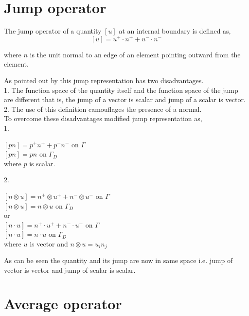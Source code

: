 \documentclass[a4paper]{book}
\begin{document}
\section{Jump operator}

The jump operator of a quantity $[u]$ at an internal boundary is defined as,
\begin{equation}\label{jump operator}
[u]=u^+ \cdot n^+ + u^- \cdot n^-
\end{equation}

where $n$ is the unit normal to an edge of an element pointing outward from the element.

As pointed out by \cite{Montlaur2} this jump representation has two disadvantages.\\

1. The function space of the quantity itself and the function space of the jump are different that is, the jump of a vector is scalar and jump of a scalar is vector.\\
2. The use of this definition camouflages the presence of a normal.\\

To overcome these disadvantages \cite{Montlaur2} modified jump representation as,\\

1.  
\begin{center}
$[pn] = p^+ n^+ + p^- n^- $ on $\Gamma$\\
$[pn] = p n $ on $\Gamma_D$\\
where $p$ is scalar.
\end{center}

2. \\
\begin{center}
$[n \otimes u] = n^+ \otimes u^+ + n^- \otimes u^-$ on $\Gamma$\\
$[n \otimes u] = n \otimes u$ on $\Gamma_D$\\
 or \\
$[n \cdot u] = n^+ \cdot u^+ + n^- \cdot u^-$ on $\Gamma$\\
$[n \cdot u] = n \cdot u$ on $\Gamma_D$\\
where $u$ is vector and $n \otimes u = u_i n_j$\\ 
\end{center}

As can be seen the quantity and its jump are now in same space i.e. jump of vector is vector and jump of scalar is scalar.

\section{Average operator}
\end{document}

